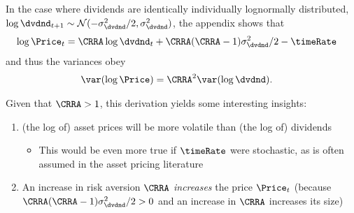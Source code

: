\documentclass{\handout}
\begin{document}
In the case where dividends are identically individually lognormally distributed, $\log \dvdnd_{t+1} \sim \mathcal{N}(-\riskyvar/2,\riskyvar)$, the appendix shows that
\begin{equation}\begin{gathered}\begin{aligned}
  \log \Price_{t} & =  \CRRA \log \dvdnd_{t} + \CRRA(\CRRA-1)\riskyvar/2 - \timeRate 
\end{aligned}\end{gathered}\end{equation}
and thus the variances obey
\begin{equation}\begin{gathered}\begin{aligned}
  \label{eq:varLogPvsLogd}
  \var({\log \Price}) & =  \CRRA^{2} \var(\log \dvdnd)
.
\end{aligned}\end{gathered}\end{equation}



Given that $\CRRA > 1$, this derivation yields some interesting insights:
\begin{enumerate}
\item (the log of) asset prices will be more volatile than (the log of) dividends
  \begin{itemize}
  \item This would be even more true if $\timeRate$ were stochastic, as is often assumed in the asset pricing literature
  \end{itemize}
  \item An increase in risk aversion $\CRRA$ \textit{increases} the price $\Price_{t}$ (because $\CRRA(\CRRA-1)\riskyvar/2 > 0$ and an increase in $\CRRA$ increases its size)  %
\end{enumerate}
\end{document}
